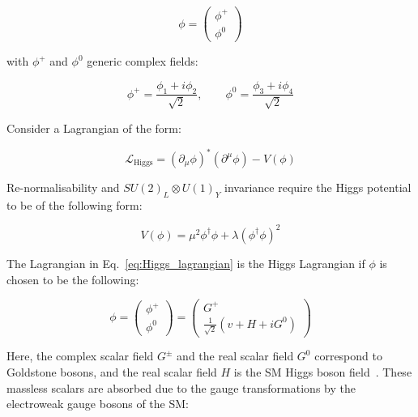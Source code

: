 			\begin{equation}
			\label{eq:Higgs_field}
				\phi = 
				\begin{pmatrix}
					\phi^+ \\ \phi^0
				\end{pmatrix} 
			\end{equation}

			\noindent with $\phi^+$ and $\phi^0$ generic complex fields: 

			\begin{equation}
				\phi^+ = \frac{\phi_1 + i \phi_2}{\sqrt{2}},  \qquad \phi^0 = \frac{\phi_3 + i \phi_4}{\sqrt{2}}
			\end{equation}

			\noindent Consider a Lagrangian of the form: 

			\begin{equation}
			\label{eq:Higgs_lagrangian}
				\mathcal{L_{\mathrm{Higgs}}} = ( \partial_{\mu} \phi )^* \left ( \partial^{\mu} \phi \right ) - V(\phi)
			\end{equation}

			\noindent Re-normalisability and $SU(2)_L \otimes U(1)_Y$ invariance require the Higgs potential to be of the following form: 

			\begin{equation}
			\label{eq:Higgs_potential}
				V(\phi) = \mu^2  \phi^\dagger \phi + \lambda \left ( \phi^\dagger \phi \right )^2 
			\end{equation}

			\noindent The Lagrangian in Eq.~\ref{eq:Higgs_lagrangian} is the Higgs Lagrangian if $\phi$ is chosen to be the following:

			\begin{equation*}
				\phi = 
				\begin{pmatrix}
					\phi^+ \\ \phi^0
				\end{pmatrix} 
				=
				\begin{pmatrix}
					G^+ \\ \frac{1}{\sqrt{2}} \left ( v + H + iG^0 \right )
				\end{pmatrix}
			\end{equation*}

			\noindent Here, the complex scalar field $G^\pm$ and the real scalar field $G^0$ correspond to Goldstone bosons, and the real scalar field $H$ is the \ac{SM} Higgs boson field~\cite{Goldstone1962}. These massless scalars are absorbed due to the gauge transformations by the electroweak gauge bosons of the \ac{SM}:

